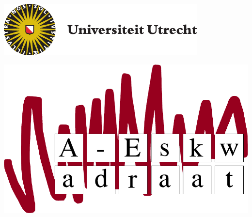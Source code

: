 \documentclass[thesis]{subfiles}
\begin{document}

\begin{titlepage} %

	\noindent
	\begin{minipage}{0.4\textwidth}
		\includegraphics[width=\linewidth]{uulogo} %
	\end{minipage}
	\hfill
    \begin{minipage}{0.2\textwidth}\raggedleft
		\includegraphics[width=\linewidth]{aes2logo-rood} %
	\end{minipage}
    
    \par\vspace{1cm}
    

\end{titlepage}
\end{document}
